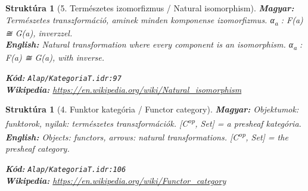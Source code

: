 \documentclass[11pt,a4paper,twocolumn]{article}
\newtheorem{struktura}[tetel]{Struktúra}
\begin{document}
\vspace{0.5cm}

\begin{struktura}[5. Természetes izomorfizmus / Natural isomorphism]

\textbf{Magyar:} Természetes transzformáció, aminek minden komponense izomorfizmus. α\textsubscript{a} : F(a) ≅ G(a), inverzzel.\\

\textbf{English:} Natural transformation where every component is an isomorphism. α\textsubscript{a} : F(a) ≅ G(a), with inverse.\\

\begin{center}
\end{center}

\textbf{Kód:} \texttt{Alap/KategoriaT.idr:97}\\
\textbf{Wikipedia:} \url{https://en.wikipedia.org/wiki/Natural_isomorphism}

\end{struktura}

\vspace{0.5cm}

\begin{struktura}[4. Funktor kategória / Functor category]

\textbf{Magyar:} Objektumok: funktorok, nyilak: természetes transzformációk. [C\textsuperscript{op}, Set] = a presheaf kategória.\\

\textbf{English:} Objects: functors, arrows: natural transformations. [C\textsuperscript{op}, Set] = the presheaf category.\\

\begin{center}
\end{center}

\textbf{Kód:} \texttt{Alap/KategoriaT.idr:106}\\
\textbf{Wikipedia:} \url{https://en.wikipedia.org/wiki/Functor_category}

\end{struktura}

\vspace{0.5cm}
\end{document}
